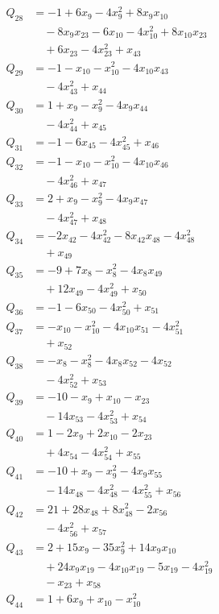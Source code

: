 \begin{align*}
Q_{28}&=-1+6x_{9}-4x_{9}^{2}+8x_{9}x_{10}\\
&\quad -8x_{9}x_{23}-6x_{10}-4x_{10}^{2}+8x_{10}x_{23}\\
&\quad +6x_{23}-4x_{23}^{2}+x_{43}\\
Q_{29}&=-1-x_{10}-x_{10}^{2}-4x_{10}x_{43}\\
&\quad -4x_{43}^{2}+x_{44}\\
Q_{30}&=1+x_{9}-x_{9}^{2}-4x_{9}x_{44}\\
&\quad -4x_{44}^{2}+x_{45}\\
Q_{31}&=-1-6x_{45}-4x_{45}^{2}+x_{46}\\
Q_{32}&=-1-x_{10}-x_{10}^{2}-4x_{10}x_{46}\\
&\quad -4x_{46}^{2}+x_{47}\\
Q_{33}&=2+x_{9}-x_{9}^{2}-4x_{9}x_{47}\\
&\quad -4x_{47}^{2}+x_{48}\\
Q_{34}&=-2x_{42}-4x_{42}^{2}-8x_{42}x_{48}-4x_{48}^{2}\\
&\quad +x_{49}\\
Q_{35}&=-9+7x_{8}-x_{8}^{2}-4x_{8}x_{49}\\
&\quad +12x_{49}-4x_{49}^{2}+x_{50}\\
Q_{36}&=-1-6x_{50}-4x_{50}^{2}+x_{51}\\
Q_{37}&=-x_{10}-x_{10}^{2}-4x_{10}x_{51}-4x_{51}^{2}\\
&\quad +x_{52}\\
Q_{38}&=-x_{8}-x_{8}^{2}-4x_{8}x_{52}-4x_{52}\\
&\quad -4x_{52}^{2}+x_{53}\\
Q_{39}&=-10-x_{9}+x_{10}-x_{23}\\
&\quad -14x_{53}-4x_{53}^{2}+x_{54}\\
Q_{40}&=1-2x_{9}+2x_{10}-2x_{23}\\
&\quad +4x_{54}-4x_{54}^{2}+x_{55}\\
Q_{41}&=-10+x_{9}-x_{9}^{2}-4x_{9}x_{55}\\
&\quad -14x_{48}-4x_{48}^{2}-4x_{55}^{2}+x_{56}\\
Q_{42}&=21+28x_{48}+8x_{48}^{2}-2x_{56}\\
&\quad -4x_{56}^{2}+x_{57}\\
Q_{43}&=2+15x_{9}-35x_{9}^{2}+14x_{9}x_{10}\\
&\quad +24x_{9}x_{19}-4x_{10}x_{19}-5x_{19}-4x_{19}^{2}\\
&\quad -x_{23}+x_{58}\\
Q_{44}&=1+6x_{9}+x_{10}-x_{10}^{2}\\

\end{align*}
